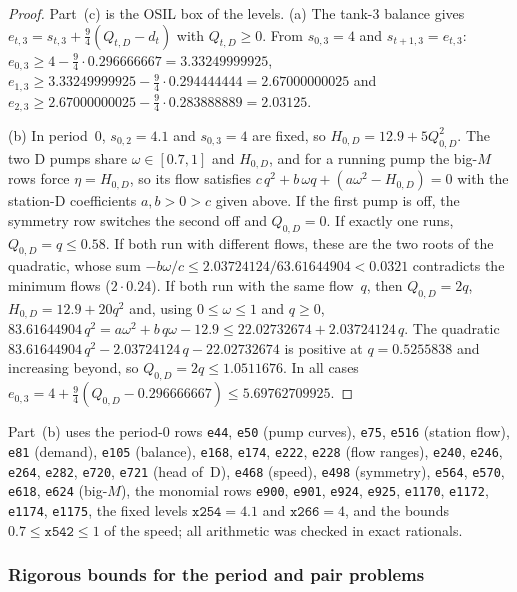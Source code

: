 \begin{proof}
Part~(c) is the OSIL box of the levels.
(a) The tank-3 balance gives $e_{t,3}=s_{t,3}+\tfrac94(Q_{t,D}-d_t)$ with $Q_{t,D}\ge0$.
From $s_{0,3}=4$ and $s_{t+1,3}=e_{t,3}$:
$e_{0,3}\ge4-\tfrac94\cdot0.296666667=3.33249999925$,
$e_{1,3}\ge3.33249999925-\tfrac94\cdot0.294444444=2.67000000025$ and
$e_{2,3}\ge2.67000000025-\tfrac94\cdot0.283888889=2.03125$.

(b) In period~0, $s_{0,2}=4.1$ and $s_{0,3}=4$ are fixed, so $H_{0,D}=12.9+5Q_{0,D}^2$.
The two D pumps share $\omega\in[0.7,1]$ and $H_{0,D}$, and for a running pump the big-$M$ rows force $\eta=H_{0,D}$, so its flow satisfies $c\,q^2+b\,\omega q+(a\omega^2-H_{0,D})=0$ with the station-D coefficients $a,b>0>c$ given above.
If the first pump is off, the symmetry row switches the second off and $Q_{0,D}=0$.
If exactly one runs, $Q_{0,D}=q\le0.58$.
If both run with different flows, these are the two roots of the quadratic, whose sum $-b\omega/c\le2.03724124/63.61644904<0.0321$ contradicts the minimum flows ($2\cdot0.24$).
If both run with the same flow~$q$, then $Q_{0,D}=2q$, $H_{0,D}=12.9+20q^2$ and, using $0\le\omega\le1$ and $q\ge0$,
$83.61644904\,q^2=a\omega^2+b\,q\omega-12.9\le22.02732674+2.03724124\,q$.
The quadratic $83.61644904\,q^2-2.03724124\,q-22.02732674$ is positive at $q=0.5255838$ and increasing beyond, so $Q_{0,D}=2q\le1.0511676$.
In all cases $e_{0,3}=4+\tfrac94(Q_{0,D}-0.296666667)\le5.69762709925$.
\end{proof}

Part~(b) uses the period-0 rows \texttt{e44}, \texttt{e50} (pump curves), \texttt{e75}, \texttt{e516} (station flow), \texttt{e81} (demand), \texttt{e105} (balance), \texttt{e168}, \texttt{e174}, \texttt{e222}, \texttt{e228} (flow ranges), \texttt{e240}, \texttt{e246}, \texttt{e264}, \texttt{e282}, \texttt{e720}, \texttt{e721} (head of~D), \texttt{e468} (speed), \texttt{e498} (symmetry), \texttt{e564}, \texttt{e570}, \texttt{e618}, \texttt{e624} (big-$M$), the monomial rows \texttt{e900}, \texttt{e901}, \texttt{e924}, \texttt{e925}, \texttt{e1170}, \texttt{e1172}, \texttt{e1174}, \texttt{e1175}, the fixed levels $\texttt{x254}=4.1$ and $\texttt{x266}=4$, and the bounds $0.7\le\texttt{x542}\le1$ of the speed; all arithmetic was checked in exact rationals.

\subsubsection{Rigorous bounds for the period and pair problems}\label{app:waterno2-bb}


